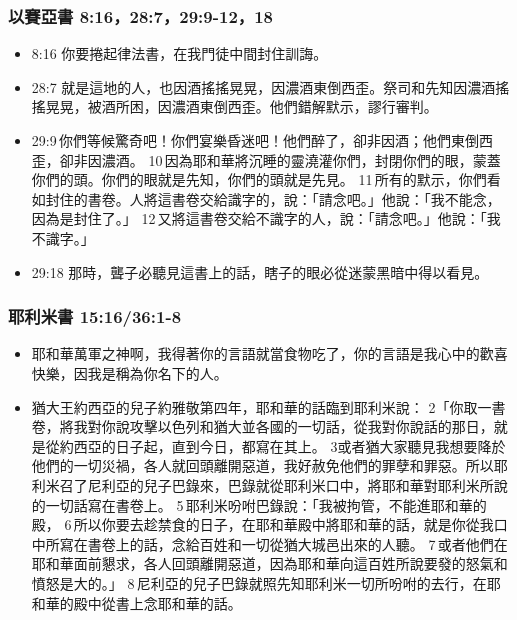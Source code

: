 \subsubsection{以賽亞書 8:16，28:7，29:9-12，18}
\begin{itemize}
\itemsep-.25em
\item 8:16 你要捲起律法書，在我門徒中間封住訓誨。
\item 28:7 就是這地的人，也因酒搖搖晃晃，因濃酒東倒西歪。祭司和先知因濃酒搖搖晃晃，被酒所困，因濃酒東倒西歪。他們錯解默示，謬行審判。
\item 29:9 你們等候驚奇吧！你們宴樂昏迷吧！他們醉了，卻非因酒；他們東倒西歪，卻非因濃酒。 10 因為耶和華將沉睡的靈澆灌你們，封閉你們的眼，蒙蓋你們的頭。你們的眼就是先知，你們的頭就是先見。 11 所有的默示，你們看如封住的書卷。人將這書卷交給識字的，說：「請念吧。」他說：「我不能念，因為是封住了。」 12 又將這書卷交給不識字的人，說：「請念吧。」他說：「我不識字。」
\item 29:18 那時，聾子必聽見這書上的話，瞎子的眼必從迷蒙黑暗中得以看見。
\end{itemize}

\subsubsection{耶利米書 15:16/36:1-8}
\begin{itemize}
\itemsep-.25em
\item 耶和華萬軍之神啊，我得著你的言語就當食物吃了，你的言語是我心中的歡喜快樂，因我是稱為你名下的人。
\item 猶大王約西亞的兒子約雅敬第四年，耶和華的話臨到耶利米說： 2「你取一書卷，將我對你說攻擊以色列和猶大並各國的一切話，從我對你說話的那日，就是從約西亞的日子起，直到今日，都寫在其上。 3或者猶大家聽見我想要降於他們的一切災禍，各人就回頭離開惡道，我好赦免他們的罪孽和罪惡。所以耶利米召了尼利亞的兒子巴錄來，巴錄就從耶利米口中，將耶和華對耶利米所說的一切話寫在書卷上。 5 耶利米吩咐巴錄說：「我被拘管，不能進耶和華的殿， 6 所以你要去趁禁食的日子，在耶和華殿中將耶和華的話，就是你從我口中所寫在書卷上的話，念給百姓和一切從猶大城邑出來的人聽。 7 或者他們在耶和華面前懇求，各人回頭離開惡道，因為耶和華向這百姓所說要發的怒氣和憤怒是大的。」 8 尼利亞的兒子巴錄就照先知耶利米一切所吩咐的去行，在耶和華的殿中從書上念耶和華的話。
\end{itemize}

